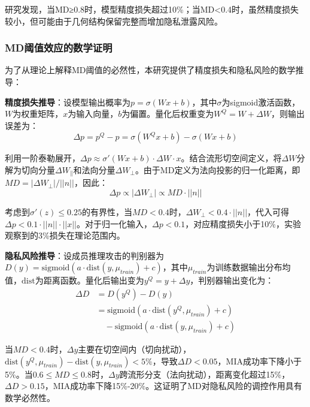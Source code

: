 研究发现，当MD≥0.8时，模型精度损失超过10\%；当MD<0.4时，虽然精度损失较小，但可能由于几何结构保留完整而增加隐私泄露风险。

\subsubsection{MD阈值效应的数学证明}

为了从理论上解释MD阈值的必然性，本研究提供了精度损失和隐私风险的数学推导：

\textbf{精度损失推导}：设模型输出概率为$p = \sigma(Wx + b)$，其中$\sigma$为sigmoid激活函数，$W$为权重矩阵，$x$为输入向量，$b$为偏置。量化后权重变为$W^Q = W + \Delta W$，则输出误差为：
\begin{equation}
\Delta p = p^Q - p = \sigma(W^Qx + b) - \sigma(Wx + b)
\end{equation}

利用一阶泰勒展开，$\Delta p \approx \sigma'(Wx + b) \cdot \Delta W \cdot x$。结合流形切空间定义，将$\Delta W$分解为切向分量$\Delta W_{\parallel}$和法向分量$\Delta W_{\perp}$。由于MD定义为法向投影的归一化距离，即$MD = |\Delta W_{\perp}| / ||n||$，因此：
\begin{equation}
\Delta p \propto |\Delta W_{\perp}| \propto MD \cdot ||n||
\end{equation}

考虑到$\sigma'(z) \leq 0.25$的有界性，当$MD < 0.4$时，$\Delta W_{\perp} < 0.4 \cdot ||n||$，代入可得$\Delta p < 0.1 \cdot ||n|| \cdot ||x||$。对于归一化输入，$\Delta p < 0.1$，对应精度损失小于10\%，实验观察到的3\%损失在理论范围内。

\textbf{隐私风险推导}：设成员推理攻击的判别器为$D(y) = \text{sigmoid}(a \cdot \text{dist}(y, \mu_{train}) + c)$，其中$\mu_{train}$为训练数据输出分布均值，$\text{dist}$为距离函数。量化后输出变为$y^Q = y + \Delta y$，判别器输出变化为：
\begin{align}
\Delta D &= D(y^Q) - D(y) \nonumber \\
&= \text{sigmoid}(a \cdot \text{dist}(y^Q, \mu_{train}) + c) \nonumber \\
&\quad - \text{sigmoid}(a \cdot \text{dist}(y, \mu_{train}) + c)
\end{align}

当$MD < 0.4$时，$\Delta y$主要在切空间内（切向扰动），$\text{dist}(y^Q, \mu_{train}) - \text{dist}(y, \mu_{train}) < 5\%$，导致$\Delta D < 0.05$，MIA成功率下降小于5\%。当$0.6 \leq MD \leq 0.8$时，$\Delta y$跨流形分支（法向扰动），距离变化超过15\%，$\Delta D > 0.15$，MIA成功率下降15\%-20\%。这证明了MD对隐私风险的调控作用具有数学必然性。

